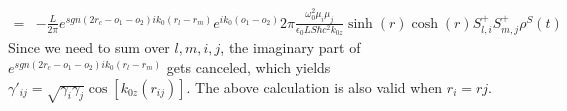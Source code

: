 \documentclass[aps,showpacs,twocolumn,twoside,groupedaddress]{revtex4}
\begin{document}
\begin{widetext}
\begin{equation}
\begin{split}
=&-\frac{L}{2\pi}e^{sgn(2r_{c}-o_{1}-o_{2})ik_{0}(r_{l}-r_{m})}e^{ik_{0}(o_{1}-o_{2})}2\pi\frac{\omega_{0}^{2}\mu_{i}\mu_{j}}{\epsilon_{0}LS\hbar c^{2}k_{0z}}\sinh(r)\cosh(r)S_{l,i}^{+}S_{m,j}^{+}\rho^{S}(t)
\end{split}
\end{equation}
Since we need to sum over $l,m,i,j$, the imaginary part of $e^{sgn(2r_{c}-o_{1}-o_{2})ik_{0}(r_{l}-r_{m})}$ gets canceled, which yields $\gamma'_{ij}=\sqrt{\gamma_{i}\gamma_{j}}\cos[k_{0z}(r_{ij})]$. The above calculation is also valid when $r_i=rj$.

\end{widetext}


\end{document}
